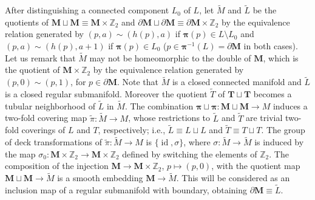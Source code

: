 \documentclass{memo-l}
\theoremstyle{plain}
\theoremstyle{definition}
\theoremstyle{remark}
\newcommand{\Z}{\mathbb{Z}}
\newcommand{\bfM}{\boldsymbol{M}}
\newcommand{\bfT}{\boldsymbol{T}}
\newcommand{\bfpi}{\boldsymbol{\pi}}
\newcommand{\id}{\operatorname{id}}
\numberwithin{section}{chapter}
\numberwithin{equation}{section}%
\begin{document}
After distinguishing a connected component $L_0$ of $L$, let $\widetilde M$  and $\widetilde L$ be the quotients of $\bfM\sqcup\bfM\equiv\bfM\times\Z_2$ and $\partial\bfM\sqcup\partial\bfM\equiv\partial\bfM\times\Z_2$ by the equivalence relation generated by $(p,a)\sim(h(p),a)$ if $\bfpi(p)\in L\setminus L_0$ and $(p,a)\sim(h(p),a+1)$ if $\bfpi(p)\in L_0$ ($p\in\bfpi^{-1}(L)=\partial\bfM$ in both cases). Let us remark that $\widetilde M$ may not be homeomorphic to the double of $\bfM$, which is the quotient of $\bfM\times\Z_2$ by the equivalence relation generated by $(p,0)\sim(p,1)$, for $p\in\partial\bfM$. Note that $\widetilde M$ is a closed connected manifold and $\widetilde L$ is a closed regular submanifold. Moreover the quotient $\widetilde T$ of $\bfT\sqcup\bfT$ becomes a tubular neighborhood of $\widetilde L$ in $\widetilde M$. The combination $\bfpi\sqcup\bfpi:\bfM\sqcup\bfM\to M$ induces a two-fold covering map $\tilde\pi:\widetilde M\to M$, whose restrictions to $\widetilde L$ and $\widetilde T$ are trivial two-fold coverings of $L$ and $T$, respectively; i.e., $\widetilde L\equiv L\sqcup L$ and $\widetilde T\equiv T\sqcup T$. The group of deck transformations of $\tilde\pi:\widetilde M\to M$ is $\{\id,\sigma\}$, where $\sigma:\widetilde M\to\widetilde M$ is induced by the map $\sigma_0:\bfM\times\Z_2\to\bfM\times\Z_2$ defined by switching the elements of $\Z_2$. The composition of the injection $\bfM\to\bfM\times\Z_2$, $p\mapsto(p,0)$, with the quotient map $\bfM\sqcup\bfM\to\widetilde M$ is a smooth embedding $\bfM\to\widetilde M$. This will be considered as an inclusion map of a regular submanifold with boundary, obtaining $\partial\bfM\equiv\widetilde L$.
\end{document}
